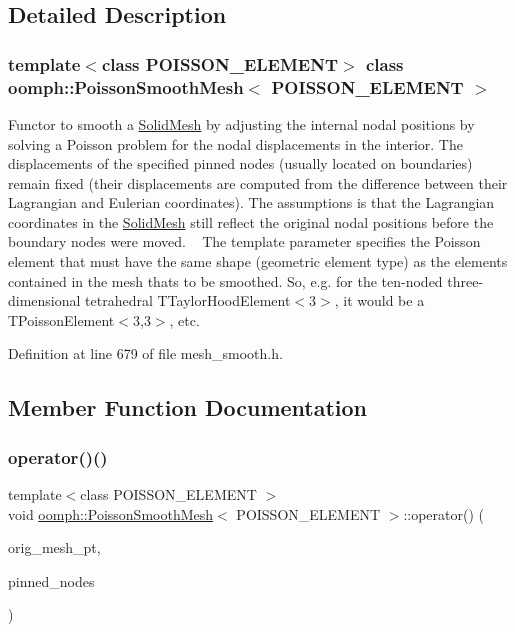 \subsection{Detailed Description}
\subsubsection*{template$<$class P\+O\+I\+S\+S\+O\+N\+\_\+\+E\+L\+E\+M\+E\+NT$>$\newline
class oomph\+::\+Poisson\+Smooth\+Mesh$<$ P\+O\+I\+S\+S\+O\+N\+\_\+\+E\+L\+E\+M\+E\+N\+T $>$}

Functor to smooth a \hyperlink{classoomph_1_1SolidMesh}{Solid\+Mesh} by adjusting the internal nodal positions by solving a Poisson problem for the nodal displacements in the interior. The displacements of the specified pinned nodes (usually located on boundaries) remain fixed (their displacements are computed from the difference between their Lagrangian and Eulerian coordinates). The assumptions is that the Lagrangian coordinates in the \hyperlink{classoomph_1_1SolidMesh}{Solid\+Mesh} still reflect the original nodal positions before the boundary nodes were moved. ~\newline
The template parameter specifies the Poisson element that must have the same shape (geometric element type) as the elements contained in the mesh that\textquotesingle{}s to be smoothed. So, e.\+g. for the ten-\/noded three-\/dimensional tetrahedral T\+Taylor\+Hood\+Element$<$3$>$, it would be a T\+Poisson\+Element$<$3,3$>$, etc. 

Definition at line 679 of file mesh\+\_\+smooth.\+h.



\subsection{Member Function Documentation}
\mbox{\label{classoomph_1_1PoissonSmoothMesh_a73231d7886dfd0ccc5cc7f7d239d746d}} 
\subsubsection{\texorpdfstring{operator()()}{operator()()}}
{\footnotesize\ttfamily template$<$class P\+O\+I\+S\+S\+O\+N\+\_\+\+E\+L\+E\+M\+E\+NT $>$ \\
void \hyperlink{classoomph_1_1PoissonSmoothMesh}{oomph\+::\+Poisson\+Smooth\+Mesh}$<$ P\+O\+I\+S\+S\+O\+N\+\_\+\+E\+L\+E\+M\+E\+NT $>$\+::operator() (\begin{DoxyParamCaption}\item[{\hyperlink{classoomph_1_1SolidMesh}{Solid\+Mesh} $\ast$}]{orig\+\_\+mesh\+\_\+pt,  }\item[{std\+::set$<$ \hyperlink{classoomph_1_1Node}{Node} $\ast$$>$}]{pinned\+\_\+nodes }\end{DoxyParamCaption})\hspace{0.3cm}{\ttfamily [inline]}}



